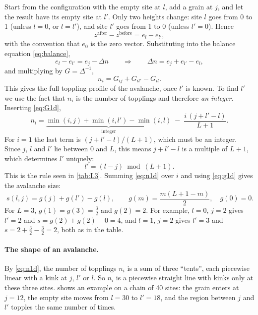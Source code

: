 Start from the configuration with the empty site at $l$, add a grain at $j$, and let the result have its empty site at $l'$.
Only two heights change: site $l$ goes from 0 to 1 (unless $l=0$, or $l=l'$), and site $l'$ goes from 1 to 0 (unless $l'=0$).
Hence
\begin{equation}
  z^{\text{after}} - z^{\text{before}} = e_l - e_{l'},
\end{equation}
with the convention that $e_0$ is the zero vector. Substituting into the balance equation \cref{eq:balance},
\begin{equation}
  e_l - e_{l'} = e_j - \Delta n\qquad\Longrightarrow\qquad \Delta n = e_j + e_{l'} - e_l ,
\end{equation}
and multiplying by $G = \Delta^{-1}$,
\begin{equation}
  n_i = G_{ij} + G_{il'} - G_{il}.
  \label{eq:n1d}
\end{equation}
This gives the full toppling profile of the avalanche, once $l'$ is known. To find $l'$ we use the fact that $n_i$ is the
number of topplings and therefore \emph{an integer}. Inserting \cref{eq:G1d},
\begin{equation}
  n_i = \underbrace{\min(i,j) + \min(i,l') - \min(i,l)}_{\text{integer}} \;-\; \frac{i\,(j + l' - l)}{L+1}.
\end{equation}
For $i=1$ the last term is $(j+l'-l)/(L+1)$, which must be an integer. Since $j$, $l$ and $l'$ lie between $0$ and $L$,
this means $j + l' - l$ is a multiple of $L+1$, which determines $l'$ uniquely:
\begin{equation}
  \boxed{\; l' = (l - j) \bmod (L+1). \;}
  \label{eq:zero-moves}
\end{equation}
This is the rule seen in \cref{tab:L3}. Summing \cref{eq:n1d} over $i$ and using \cref{eq:g1d} gives the avalanche size:
\begin{equation}
  \boxed{\; s(l,j) = g(j) + g(l') - g(l),\qquad g(m) = \frac{m(L+1-m)}{2},\quad g(0)=0. \;}
  \label{eq:s1d}
\end{equation}
For $L=3$, $g(1)=g(3)=\tfrac32$ and $g(2)=2$. For example, $l=0$, $j=2$ gives $l'=2$ and $s = g(2)+g(2)-0 = 4$, and $l=1$,
$j=2$ gives $l' = 3$ and $s = 2 + \tfrac32 - \tfrac32 = 2$, both as in the table.

\paragraph{The shape of an avalanche.} By \cref{eq:n1d}, the number of topplings $n_i$ is a sum of three ``tents'', each
piecewise linear with a kink at $j$, $l'$ or $l$. So $n_i$ is a piecewise straight line with kinks only at these three sites.
 shows an example on a chain of 40 sites: the grain enters at $j=12$, the empty site moves from $l=30$
to $l'=18$, and the region between $j$ and $l'$ topples the same number of times.

